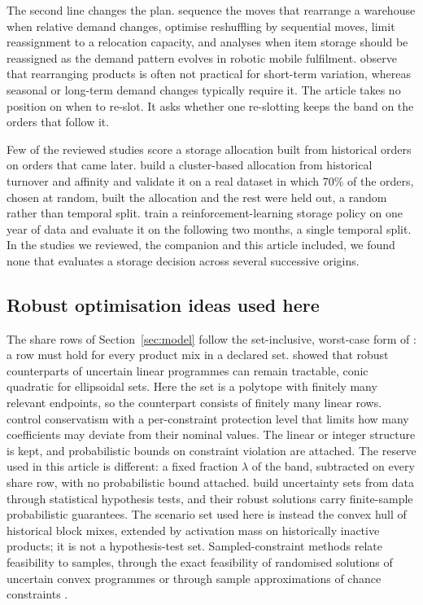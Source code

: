 The second line changes the plan. \citet{christofides1973rearrangement} sequence the moves that rearrange a warehouse when relative demand changes, \citet{pazour2015reshuffling} optimise reshuffling by sequential moves, \citet{kim2022dynamic} limit reassignment to a relocation capacity, and \citet{wu2026reassignment} analyses when item storage should be reassigned as the demand pattern evolves in robotic mobile fulfilment. \citet{winkelmann2025integrated} observe that rearranging products is often not practical for short-term variation, whereas seasonal or long-term demand changes typically require it. The article takes no position on when to re-slot. It asks whether one re-slotting keeps the band on the orders that follow it.

Few of the reviewed studies score a storage allocation built from historical orders on orders that came later. \citet{mirzaei2021ica} build a cluster-based allocation from historical turnover and affinity and validate it on a real dataset in which 70\% of the orders, chosen at random, built the allocation and the rest were held out, a random rather than temporal split. \citet{waubertdepuiseau2022dslap} train a reinforcement-learning storage policy on one year of data and evaluate it on the following two months, a single temporal split. In the studies we reviewed, the companion and this article included, we found none that evaluates a storage decision across several successive origins.

\subsection{Robust optimisation ideas used here}\label{subsec:rw_robust}
The share rows of Section~\ref{sec:model} follow the set-inclusive, worst-case form of \citet{soyster1973convex}: a row must hold for every product mix in a declared set. \citet{bental1999robust} showed that robust counterparts of uncertain linear programmes can remain tractable, conic quadratic for ellipsoidal sets. Here the set is a polytope with finitely many relevant endpoints, so the counterpart consists of finitely many linear rows. \citet{bertsimas2003robust,bertsimas2004price} control conservatism with a per-constraint protection level that limits how many coefficients may deviate from their nominal values. The linear or integer structure is kept, and probabilistic bounds on constraint violation are attached. The reserve used in this article is different: a fixed fraction $\lambda$ of the band, subtracted on every share row, with no probabilistic bound attached. \citet{bertsimas2018datadriven} build uncertainty sets from data through statistical hypothesis tests, and their robust solutions carry finite-sample probabilistic guarantees. The scenario set used here is instead the convex hull of historical block mixes, extended by activation mass on historically inactive products; it is not a hypothesis-test set. Sampled-constraint methods relate feasibility to samples, through the exact feasibility of randomised solutions of uncertain convex programmes \citep{campi2008exact} or through sample approximations of chance constraints \citep{luedtke2008sample}.

